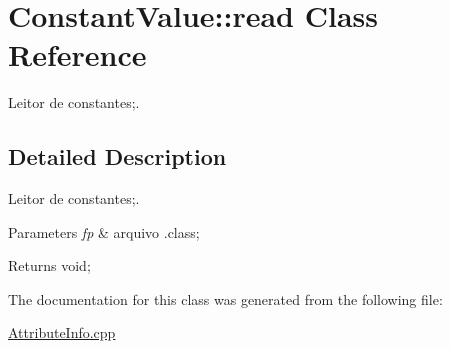 \hypertarget{class_constant_value_1_1read}{}\section{Constant\+Value\+:\+:read Class Reference}
\label{class_constant_value_1_1read}


Leitor de constantes;.  




\subsection{Detailed Description}
Leitor de constantes;. 


\begin{DoxyParams}{Parameters}
{\em fp} & arquivo .class; \\
\hline
\end{DoxyParams}
\begin{DoxyReturn}{Returns}
void; 
\end{DoxyReturn}


The documentation for this class was generated from the following file\+:\begin{DoxyCompactItemize}
\item 
\hyperlink{_attribute_info_8cpp}{Attribute\+Info.\+cpp}\end{DoxyCompactItemize}
